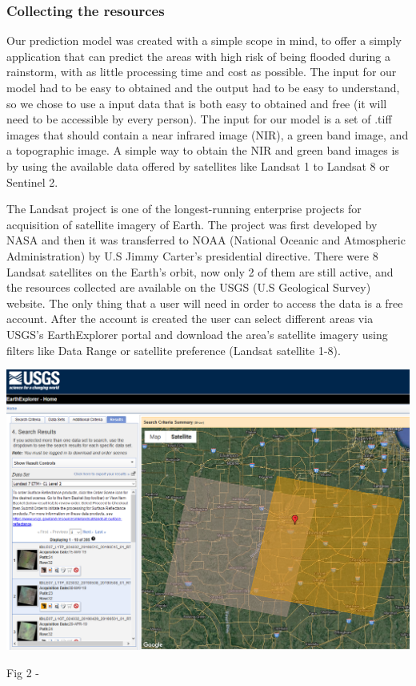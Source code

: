 \documentclass[12pt, a4paper]{report}
\begin{document}
\subsubsection{Collecting the resources}

\quad
Our prediction model was created with a simple scope in mind, to offer a simply  application that can predict the areas with high risk of being flooded during a rainstorm, with as little processing time and cost as possible. The input for our model had to be easy to obtained and the output had to be easy to understand, so we chose to use a input data that is both easy to obtained and free (it will need to be accessible by every person). The input for our model is a set of .tiff images that should contain a near infrared image (NIR), a green band image, and a topographic image. A simple way to obtain the NIR and green band images is by using the available data offered by satellites like Landsat 1 to Landsat 8 or Sentinel 2. 

\par 
The Landsat project is one of the longest-running enterprise projects for acquisition of satellite imagery of Earth. The project was first developed by NASA and then it was transferred to NOAA (National Oceanic and Atmospheric Administration) by U.S Jimmy Carter's presidential directive. There were 8 Landsat satellites on the Earth's orbit, now only 2 of them are still active, and the resources collected are available on the USGS (U.S Geological Survey) website. The only thing that a user will need in order to access the data is a free account. After the account is created the user can select different areas via USGS's EarthExplorer portal and download the area's satellite imagery using filters like Data Range or satellite preference (Landsat satellite 1-8).
\par

\bigskip

\includegraphics[scale=0.5, right]{landsat_search.png} 
\begin{center}
Fig 2 - \cite{USGS}
\end{center}
\end{document}
